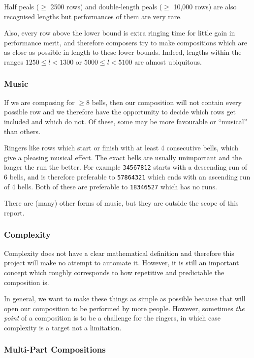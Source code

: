 \documentclass[12pt]{article}
\newcommand{\row}[1]{\texttt{#1}}
\begin{document}
Half peals ($\ge$ 2500 rows) and double-length peals ($\ge$ 10,000 rows) are also recognised lengths
but performances of them are very rare.

Also, every row above the lower bound is extra ringing time for little gain in performance merit,
and therefore composers try to make compositions which are as close as possible in length to these
lower bounds.  Indeed, lengths within the ranges $1250 \le l < 1300$ or $5000 \le l < 5100$ are
almost ubiquitous.

\subsubsection{Music}

If we are composing for $\ge 8$ bells, then our composition will not contain every possible row and
we therefore have the opportunity to decide which rows get included and which do not.  Of these, some
may be more favourable or ``musical'' than others.

Ringers like rows which start or finish with at least 4 consecutive bells, which give a pleasing
musical effect.  The exact bells are usually unimportant and the longer the run the better.  For
example \row{34567812} starts with a descending run of 6 bells, and is therefore preferable to
\row{57864321} which ends with an ascending run of 4 bells.  Both of these are preferable to
\row{18346527} which has no runs.

There are (many) other forms of music, but they are outside the scope of this report.

\subsubsection{Complexity}

Complexity does not have a clear mathematical definition and therefore this project will make no
attempt to automate it.  However, it is still an important concept which roughly corresponds to how
repetitive and predictable the composition is.

In general, we want to make these things as simple as possible because that will open our
composition to be performed by more people.  However, sometimes \emph{the point} of a composition is
to be a challenge for the ringers, in which case complexity is a target not a limitation.

\subsubsection{Multi-Part Compositions}
\end{document}
